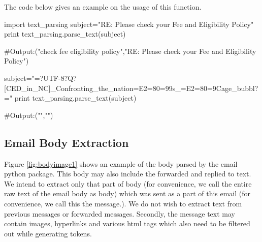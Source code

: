 \documentclass[fleqn]{MJDArticle}
\begin{document}
\par
The code below gives an example on the usage of this function. 
\begin{code}
import text_parsing
subject="RE: Please check your Fee and Eligibility Policy"
print text_parsing.parse_text(subject)

#Output:("check fee eligibility policy","RE: Please check your Fee and Eligibility Policy")

subject="=?UTF-8?Q?[CED_in_NC]_Confronting_the_nation=E2=80=99s_=E2=80=9Cage_bubbl?="
print text_parsing.parse_text(subject)

#Output:("","")
\end{code}
\subsection{Email Body Extraction}
Figure \ref{fig:bodyimage1} shows an  example of the body parsed by the email python package. This body may also include the forwarded and replied to text. We intend to extract only that part of body (for convenience, we call the entire raw text of the email body as body) which was sent as a part of this email (for convenience, we call this the message.). We do not wish to extract text from previous messages or forwarded messages.  Secondly, the message text may contain images, hyperlinks and various html tags which also need to be filtered out while generating tokens. 
\end{document}
